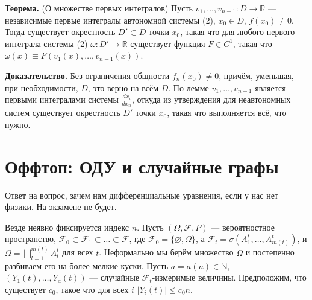 \QED

\textbf{Теорема.} (О множестве первых интегралов) Пусть $v_1, \dots, v_{n-1}: D \to \mathbb R$ --- независимые первые интегралы автономной системы (2), $x_0 \in D$, $f(x_0) \ne 0$.
Тогда существует окрестность $D' \subset D$ точки $x_0$, такая что для любого первого интеграла системы (2) $\omega: D' \to \mathbb R$ существует функция $F \in C^1$, такая что $\omega(x) \equiv F(v_1(x), \dots, v_{n-1}(x))$.

\textbf{Доказательство.} Без ограничения общности $f_n(x_0) \ne 0$, причём, уменьшая, при необходимости, $D$, это верно на всём $D$.
По лемме $v_1, \dots, v_{n-1}$ является первыми интегралами системы $\frac{dx_i}{dx_n}$, откуда из утверждения для неавтономных систем существует окрестность $D'$ точки $x_0$, такая что выполняется всё, что нужно.

\QED

\section{Оффтоп: ОДУ и случайные графы}
Ответ на вопрос, зачем нам дифференциальные уравнения, если у нас нет физики.
На экзамене не будет.

Везде неявно фиксируется индекс $n$.
Пусть $(\Omega, \mathcal F, P)$ --- вероятностное пространство, $\mathcal F_0 \subset \mathcal F_1 \subset \dots \subset \mathcal F$, где $\mathcal F_0 = \{\varnothing, \Omega\}$, а $\mathcal F_t = \sigma(A_1^t, \dots, A_{m(t)}^t)$, и $\Omega = \bigsqcup_{l=1}^{m(t)} A_l^t$ для всех $t$.
Неформально мы берём множество $\Omega$ и постепенно разбиваем его на более мелкие куски.
Пусть $a = a(n) \in \mathbb N$, $(Y_1(t), \dots, Y_a(t))$ --- случайные $\mathcal F_t$-измеримые величины.
Предположим, что существует $c_0$, такое что для всех $i$ $|Y_i(t)| \le c_0 n$.

